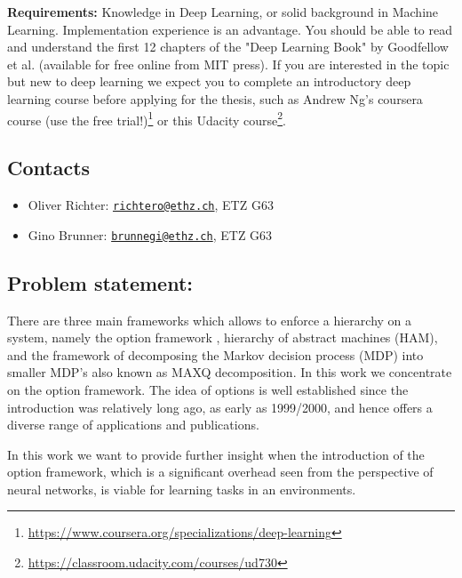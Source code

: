 \documentclass[a4paper,11pt]{article}
\begin{document}
\bigskip

\noindent \textbf{Requirements:} Knowledge in Deep Learning, or solid background in Machine Learning. Implementation experience is an advantage. You should be able to read and understand the first 12 chapters of the "Deep Learning Book" by Goodfellow et al. (available for free online from MIT press). If you are interested in the topic but new to deep learning we expect you to complete an introductory deep learning course before applying for the thesis, such as Andrew Ng's coursera course (use the free trial!)\footnote{\url{https://www.coursera.org/specializations/deep-learning}} or this Udacity course\footnote{\url{https://classroom.udacity.com/courses/ud730}}. 
\bigskip

\subsection*{Contacts}
\begin{itemize}
	\item Oliver Richter: \href{mailto:Oliver Richter<richtero@ethz.ch>}{\texttt{richtero@ethz.ch}}, ETZ G63
	\item Gino Brunner: \href{mailto:Gino Brunner <brunnegi@ethz.ch>}{\texttt{brunnegi@ethz.ch}}, ETZ G63
\end{itemize}

 \newpage
 
\subsection*{Problem statement:}
There are three main frameworks which allows to enforce a hierarchy on a system, namely the option framework , hierarchy of abstract machines (HAM), and the framework of decomposing the Markov decision process (MDP) into smaller MDP's also known as MAXQ decomposition. In this work we concentrate on the option framework. The idea of options is well established since the introduction was relatively long ago, as early as 1999/2000, and hence offers a diverse range of applications and publications.

In this work we want to provide further insight when the introduction of the option framework, which is a significant overhead seen from the perspective of neural networks, is viable for learning tasks in an environments. 
\end{document}
